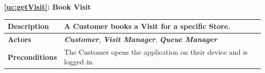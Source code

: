 \documentclass[a4paper, 12pt, oneside]{article}
\begin{document}
\begin{center}
{\textbf{\ref{uc:getVisit}: Book Visit}}
\end{center}
\begin{tabularx}{\linewidth}{| l | X |}
	
	\hline
	\textbf{Description} & A Customer books a Visit for a specific Store.\\
	

	\hline
	\textbf{Actors} & \textbf{\textit{Customer}}, \textbf{\textit{Visit Manager}}, \textit{\textbf{Queue Manager}}\\
	
	\hline
	\textbf{Preconditions} & The Customer opens the application on their device and is logged in.\\
	

\end{tabularx}
\end{document}

